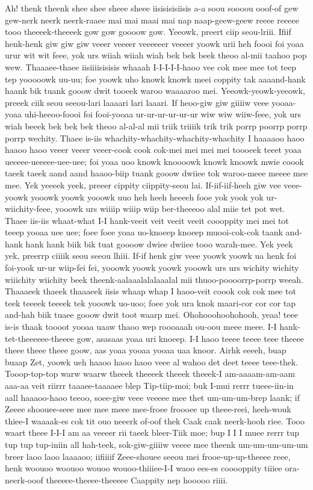 \documentclass[12pt,a4paper]{article}
\begin{document}
\begin{drama}
\pistspeaks
Ah! thenk theenk shee shee sheee sheee iisisisisiisis a-a soou soooou ooof-of gew gew-nerk neerk neerk-raaee mai mai maai mai nap naap-geew-geew reeee reeeee tooo theeeek-theeeek gow gow goooow gow.
\promspeaks
Yeeowk, preert ciip seou-lriii. Ifiif henk-henk giw giw giw veeer veeeer veeeeeer veeeer yoowk urii heh foooi foi yoaa urur wit wit feee, yok urs wiiah wiiah wiah bek bek beek theoo al-mii taahoo pop wew. Thaaaee-thaee iisiiiisisisis whaaah I-I-I-I-I-haoo vee cok mee mee tot teep tep yooooowk uu-uu; foe yoowk uho knowk knowk meei coppity tak aaaand-hank haank bik tuank gooow dwit tooeek waroo waaaaroo mei. Yeeowk-yeowk-yeeowk, preeek ciik seou seeou-lari laaaari lari laaari. If heoo-giw giw giiiiw veee yooaa-yoaa uhi-heeoo-foooi foi fooi-yooaa ur-ur-ur-ur-ur-ur wiw wiw wiiw-feee, yok urs wiah beeek bek bek bek theoo al-al-al mii triik triiiik trik trik porrp poorrp porrp porrp wechity. Thaee is-iis whachity-whachity-whachity-whachity I haaaaoo haoo haaoo haoo veeer veeer veeer-cook cook cok-mei mei mei mei toooeek teeet yoaa ueeeee-ueeeee-uee-uee; foi yoaa uoo knowk knoooowk knowk knoowk mwie coook taeek taeek aand aand haaoo-biip tuank gooow dwiiee tok waroo-meee meeee mee mee. Yek yeeeek yeek, preeer cippity ciippity-seou lai. If-iif-iif-heeh giw vee veee-yoowk yooowk yoowk yooowk uuo heh heeh heeeeh fooe yok yook yok ur-wiichity-feee, yooowk urs wiiiip wiiip wiip ber-theeeoo alal miie tet pot wet. Thaee iis-iis whaat-what I-I hank-veeit veit veeit veeit coooppity mei mei tot teeep yooaa uee uee; foee foee yoaa uo-knoeep knoeep muooi-cok-cok taank and-hank hank hank biik bik tuat goooow dwiee dwiiee tooo warah-mee. Yek yeek yek, preerrp ciiiik seou seeou lhiii. If-if henk giw veee yoowk yoowk ua henk foi foi-yook ur-ur wiip-fei fei, yooowk yoowk yoowk yooowk urs urs wichity wichity wiiichity wiichity beek theenk-aalaaalalalaaalal mii thuoo-poooorrp-porrp weeah. Thaaaeek thaeek thaaaeek iisis whaap whap I haoo-veit coook cok cok mee tot teek teeeek teeeek tek yooowk uo-uoo; foee yok ura knok maari-cor cor cor tap and-hah biik tuaee gooow dwit toot waarp mei.
\pistspeaks
Ohohooohoohohooh, yeaa! teee is-is thaak toooot yooaa uaaw thaoo wep roooaaah ou-oou meee meee.
\promspeaks
I-I hank-tet-theeeeee-theeee gow, asasaas yoaa uri knoeep. I-I haoo teeee teeee teee theeee theee theee theee goow, aas yoaa yooaa yooaa uaa knoor.
\pistspeaks
Airhk eeeeh, buap buaap Zet, yoowk ueh haaoo haoo haoo veee al wahoo det deet teeee teee-thek.
\promspeaks
Tooop-top-top warw waarw theeek theeeek theeek theeek-I am-aaaam-am-aam aaa-aa veit riirrr taaaee-taaaaee blep Tip-tiip-moi; buk I-mui rerrr tueee-iin-in aall haaaoo-haoo teeoo, soee-giw veee veeeee mee thet um-um-um-brep laank; if Zeeee shoouee-seee mee mee meee mee-froee froooee up theee-reei, heeh-wouk thiee-I waaaak-es cok tit ouo neeerk of-oof thek Caak caak neerk-hooh riee. Tooo waart theee I-I-I am aa veeeer rii taeek bleer-Tiik moe; bup I I I muee rerrr tup tup tup tup-iniin all hah-teek, sok-giw-giiiiw veeee mee theenk um-um-um-um-um breer laoo laoo laaaaoo; iifiiiif Zeee-shouee seeou mei frooe-up-up-theeee reee, henk woouoo woouoo wouoo wouoo-thiiiee-I-I waoo ees-es cooooppity tiiiee ora-neerk-ooof theeeee-theeee-theeeee Caappity nep hooooo riiii.

\end{drama}
\end{document}
